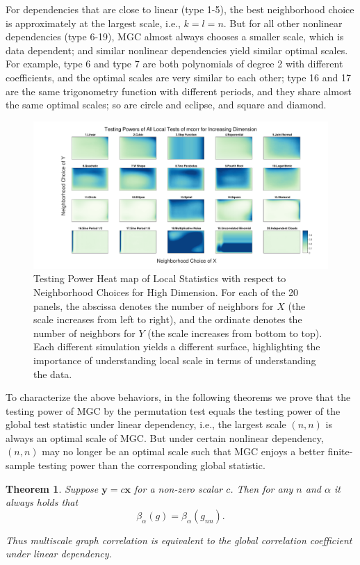 \documentclass[11pt]{article}
\providecommand{\mb}[1]{\boldsymbol{#1}}
\newtheorem{thm}{Theorem}
\begin{document}
For dependencies that are close to linear (type 1-5), the best neighborhood choice is approximately at the largest scale, i.e., $k=l=n$. But for all other nonlinear dependencies (type 6-19), MGC almost always chooses a smaller scale, which is data dependent; and similar nonlinear dependencies yield similar optimal scales. For example, type 6 and type 7 are both polynomials of degree 2 with different coefficients, and the optimal scales are very similar to each other; type 16 and 17 are the same trigonometry function with different periods, and they share almost the same optimal scales; so are circle and eclipse, and square and diamond.

\begin{figure}[htbp]
\includegraphics[width=1.0\textwidth]{../Figures/Fig6}
\caption{Testing Power Heat map of Local Statistics with respect to Neighborhood Choices for High Dimension.
For each of the 20 panels, the abscissa denotes the number of neighbors for $X$ (the scale increases from left to right), and the ordinate denotes the number of neighbors for $Y$ (the scale increases from bottom to top).  Each different simulation yields a different surface, highlighting the importance of understanding local scale in terms of understanding the data.}
\label{figSim6}
\end{figure}

To characterize the above behaviors, in the following theorems we prove that the testing power of MGC by the permutation test equals the testing power of the global test statistic under linear dependency, i.e., the largest scale $(n,n)$ is always an optimal scale of MGC. But under certain nonlinear dependency, $(n,n)$ may no longer be an optimal scale such that MGC enjoys a better finite-sample testing power than the corresponding global statistic. 

\begin{thm}
\label{thm2}
Suppose $\mb{y}=c\mb{x}$ for a non-zero scalar $c$. Then for any $n$ and $\alpha$ it always holds that
\begin{equation}
\beta_{\alpha}(g) = \beta_{\alpha}(g_{nn}).
\end{equation}

Thus multiscale graph correlation is equivalent to the global correlation coefficient under linear dependency.
\end{thm}
\end{document}
